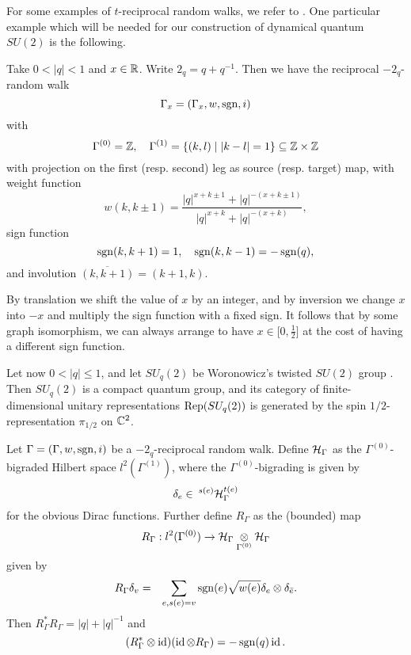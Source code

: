 
For some examples of $t$-reciprocal random walks, we refer to \cite{DCY1}. One particular example which will be needed for our construction of dynamical quantum $SU(2)$ is the following.

\begin{Exa}\label{ExaGraphPod} Take $0<|q|<1$ and $x\in \R$. Write $2_q = q+q^{-1}$. Then we have the reciprocal $-2_q$-random walk \[\Gamma_x =(\Gamma_x,w,\sgn,i)\] with \[ \Gamma^{(0)} = \Z,\quad \Gamma^{(1)} = \{(k,l)\mid |k-l|= 1\}\subseteq \Z\times \Z\] with projection on the first (resp. second) leg as source (resp. target) map, with weight function \[w(k,k\pm 1) = \frac{|q|^{x+k\pm 1}+|q|^{-(x+k\pm 1)}}{|q|^{x+k}+|q|^{-(x+k)}},\] sign function \[\sgn(k,k+1) = 1,\quad \sgn(k,k-1) = -\sgn(q),\] and involution $\overline{(k,k+1)} = (k+1,k)$. 

By translation we shift the value of $x$ by an integer, and by inversion we change $x$ into $-x$ and multiply the sign function with a fixed sign. It follows that by some graph isomorphism, we can always arrange to have $x\in \lbrack 0,\frac{1}{2}\rbrack$ at the cost of having a different sign function.
\end{Exa} 

Let now $0<|q|\leq 1$, and let $SU_q(2)$ be Woronowicz's twisted $SU(2)$ group \cite{Wor1}. Then $SU_q(2)$ is a compact quantum group, and its category of finite-dimensional unitary representations $\Rep(SU_q(2))$ is generated by the spin $1/2$-representation $\pi_{1/2}$ on $\C^2$.

Let $\Gamma = (\Gamma,w,\sgn,i)$ be a $-2_q$-reciprocal random walk. Define $\Hsp_{\Gamma}$ as the $\Gamma^{(0)}$-bigraded Hilbert space $l^2(\Gamma^{(1)})$, where the $\Gamma^{(0)}$-bigrading is given by \[\delta_e \in \Gru{\Hsp_{\Gamma}}{s(e)}{t(e)}\] for the obvious Dirac functions. Further define $R_{\Gamma}$ as the (bounded) map \[R_{\Gamma}:l^2(\Gamma^{(0)})\rightarrow \Hsp_{\Gamma}\underset{\Gamma^{(0)}}{\otimes} \Hsp_{\Gamma}\] given by \begin{eqnarray*} R_{\Gamma} \delta_v &=& \sum_{e,s(e) = v} \sgn(e)\sqrt{w(e)}\delta_e \otimes \delta_{\bar{e}}.\end{eqnarray*} Then $R_{\Gamma}^*R_{\Gamma} = |q|+|q|^{-1}$ and \[(R_{\Gamma}^*\otimes \id)(\id\otimes R_{\Gamma}) = -\sgn(q)\id.\]



